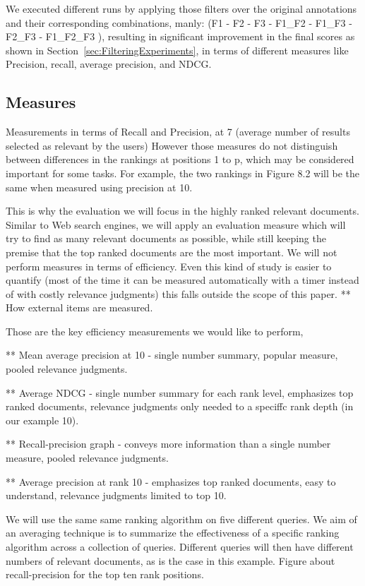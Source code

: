 \documentclass{llncs}
\begin{document}
We executed different runs by applying those filters over the original annotations and their corresponding combinations, manly: (F1 - F2 - F3 - F1\_F2 - F1\_F3 - F2\_F3 - F1\_F2\_F3 ), resulting in significant improvement in the final scores as shown in Section~\ref{sec:FilteringExperiments}, in terms of different measures like Precision, recall, average precision, and NDCG.

\subsection{Measures}
Measurements in terms of Recall and Precision, at 7 (average number of results selected as relevant by the users)
However those measures do not distinguish between differences in the rankings at positions 1 to p, which may be considered important for some tasks. For example, the two rankings in Figure 8.2 will be the same when measured using precision at 10.

This is why  the evaluation we will focus in the highly ranked relevant documents. Similar to Web search engines, we will apply an evaluation measure which will try to find as many relevant documents as possible, while still keeping the  premise that the top ranked documents are the most important. We will not perform measures in terms of efficiency. Even this kind of study is easier to quantify (most of the time it can be measured automatically with a timer instead of with costly relevance judgments) this falls outside the scope of this paper.
** How external items are measured.

Those are the key efficiency measurements we would like to perform,

** Mean average precision at 10  - single number summary, popular measure, pooled
relevance judgments.

** Average NDCG - single number summary for each rank level, emphasizes top ranked documents, relevance judgments only needed to a speciffc rank depth
(in our example 10).

** Recall-precision graph - conveys more information than a single number measure, pooled relevance judgments.

** Average precision at rank 10 - emphasizes top ranked documents, easy to understand, relevance judgments limited to top 10.

We will use the same same ranking algorithm on five different queries. We aim of an averaging technique is to summarize the effectiveness of a specific ranking algorithm across a collection of queries. Different queries will then have different numbers of relevant documents, as is the case in this example. Figure about recall-precision for the top ten rank positions.
\end{document}
